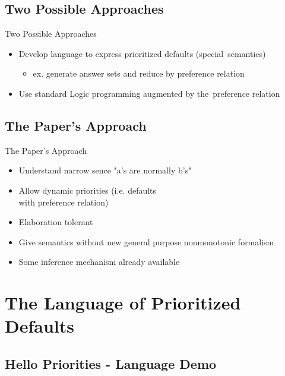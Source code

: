 \documentclass{beamer}
\begin{document}
  \subsection[Approaches]{Two Possible Approaches}

  \begin{frame}{Two Possible Approaches}
    \begin{itemize}
      \item Develop language to express prioritized defaults (special~semantics)
      \begin{itemize}
        \item ex. generate answer sets and reduce by preference relation
      \end{itemize}
      \item Use standard Logic programming augmented by the~preference relation
    \end{itemize}
  \end{frame}

  \subsection[The Paper's Approach]{The Paper's Approach}

  \begin{frame}{The Paper's Approach}
    \begin{itemize}
      \item Understand narrow sence "a's are normally b's"
      \item Allow dynamic priorities (i.e. defaults \\ with preference relation)
      \item Elaboration tolerant
      \item Give semantics without new general purpose nonmonotonic formalism
      \item Some inference mechanism already available
    \end{itemize}
  \end{frame}


\section{The Language of Prioritized Defaults}

  \subsection{Hello Priorities - Language Demo}
  
\end{document}
